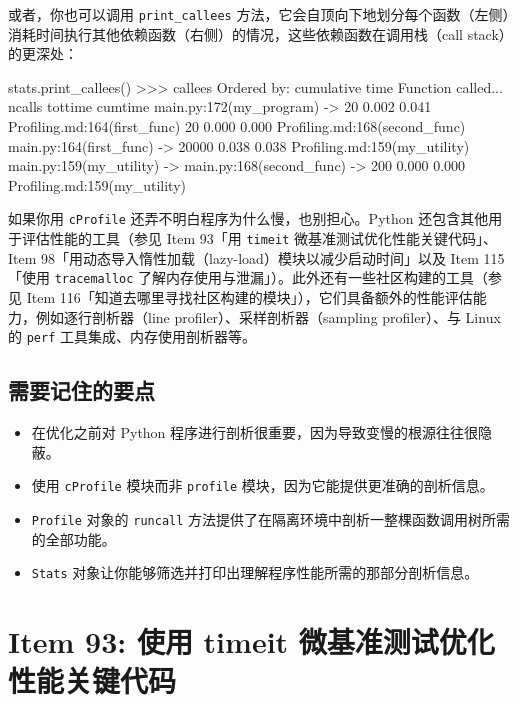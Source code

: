 或者，你也可以调用 \texttt{print\_callees} 方法，它会自顶向下地划分每个函数（左侧）消耗时间执行其他依赖函数（右侧）的情况，这些依赖函数在调用栈（call stack）的更深处：

\begin{codebox}[python]
stats.print_callees()
>>>
callees
   Ordered by: cumulative time
Function                      called...
                                   ncalls  tottime  cumtime
main.py:172(my_program)       ->      20    0.002    0.041  Profiling.md:164(first_func)
                                       20    0.000    0.000  Profiling.md:168(second_func)
main.py:164(first_func)       ->   20000    0.038    0.038  Profiling.md:159(my_utility)
main.py:159(my_utility)       ->
main.py:168(second_func)      ->     200    0.000    0.000  Profiling.md:159(my_utility)
\end{codebox}

如果你用 \texttt{cProfile} 还弄不明白程序为什么慢，也别担心。Python 还包含其他用于评估性能的工具（参见 Item 93「用 \texttt{timeit} 微基准测试优化性能关键代码」、Item 98「用动态导入惰性加载（lazy-load）模块以减少启动时间」以及 Item 115「使用 \texttt{tracemalloc} 了解内存使用与泄漏」）。此外还有一些社区构建的工具（参见 Item 116「知道去哪里寻找社区构建的模块」），它们具备额外的性能评估能力，例如逐行剖析器（line profiler）、采样剖析器（sampling profiler）、与 Linux 的 \texttt{perf} 工具集成、内存使用剖析器等。

\subsection{需要记住的要点}

\begin{itemize}
\item 在优化之前对 Python 程序进行剖析很重要，因为导致变慢的根源往往很隐蔽。
\item 使用 \texttt{cProfile} 模块而非 \texttt{profile} 模块，因为它能提供更准确的剖析信息。
\item \texttt{Profile} 对象的 \texttt{runcall} 方法提供了在隔离环境中剖析一整棵函数调用树所需的全部功能。
\item \texttt{Stats} 对象让你能够筛选并打印出理解程序性能所需的那部分剖析信息。
\end{itemize}

\section{Item 93: 使用 timeit 微基准测试优化性能关键代码}

